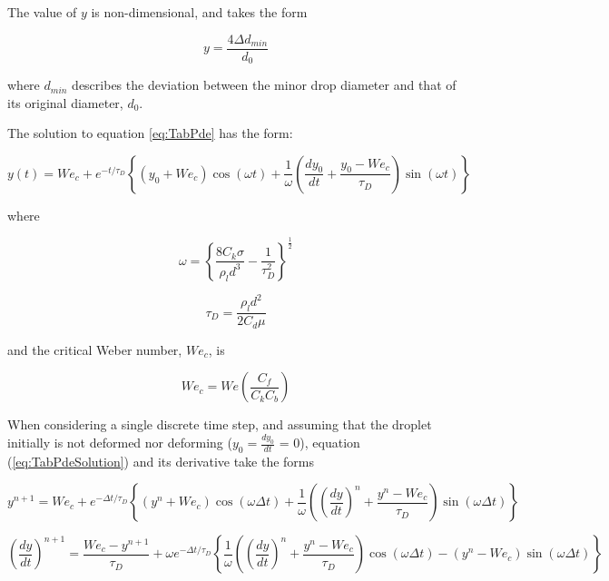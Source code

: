 \documentclass[12pt]{article}
\begin{document}
The value of $y$ is non-dimensional, and takes the form

\begin{equation}
y = \frac{4\Delta d_{min}}{d_{0}}
\end{equation}

where $d_{min}$ describes the deviation between the minor drop diameter and that of its original diameter, $d_{0}$.

The solution to equation \ref{eq:TabPde} has the form:

\begin{equation}\label{eq:TabPdeSolution}
y(t) = We_{c} + e^{-t/\tau_{D}}\left\{(y_{0} + We_{c})\cos{(\omega t) + \frac{1}{\omega}\left(\frac{dy_{0}}{dt} + \frac{y_{0} - We_{c}}{\tau_{D}}\right)\sin{(\omega t)}}\right\}
\end{equation}

where

\begin{equation}\label{eq:omega}
\omega = \left\{\frac{8C_{k}\sigma}{\rho_{l}d^{3}} - \frac{1}{\tau_{D}^{2}}\right\}^{\frac{1}{2}}
\end{equation}

\begin{equation}
\tau_{D} = \frac{\rho_{l}d^{2}}{2C_{d}\mu}
\end{equation}

and the critical Weber number, $We_{c}$, is

\begin{equation}
We_{c} = We\left(\frac{C_{f}}{C_{k}C_{b}}\right)
\end{equation}

When considering a single discrete time step, and assuming that the droplet initially is not deformed nor deforming ($y_{0} = \frac{dy_{0}}{dt}$ = 0), equation (\ref{eq:TabPdeSolution}) and its derivative take the forms

\begin{equation}\label{eq:TabPdeSolutionDiscretized}
y^{n+1} = We_{c} + e^{-\Delta t/\tau_{D}}\left\{(y^{n} + We_{c})\cos{(\omega \Delta t) + \frac{1}{\omega}\left(\left(\frac{dy}{dt}\right)^{n} + \frac{y^{n} - We_{c}}{\tau_{D}}\right)\sin{(\omega \Delta t)}}\right\}
\end{equation}

\begin{equation}\label{eq:TabPdeSolutionDiscretizedDeriv}
\left(\frac{dy}{dt}\right)^{n+1} = \frac{We_{c} - y^{n+1}}{\tau_{D}} + \omega e^{-\Delta t/\tau_{D}}\left\{\frac{1}{\omega}\left(\left(\frac{dy}{dt}\right)^{n} + \frac{y^{n} - We_{c}}{\tau_{D}}\right)\cos{(\omega \Delta t) - (y^{n} - We_{c})\sin{(\omega \Delta t)}}\right\}
\end{equation}
\end{document}
